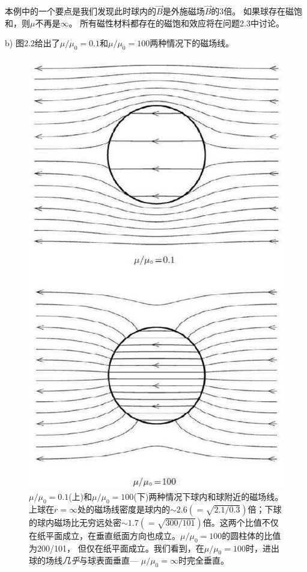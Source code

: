 本例中的一个要点是我们发现此时球内的$\vec{B}$是外施磁场$\vec{B}$的3倍。
如果球存在磁饱和，则$\mu$不再是$\infty$。
所有磁性材料都存在的磁饱和效应将在问题2.3中讨论。

b) 图2.2给出了$\mu/\mu_0=0.1$和$\mu/\mu_0=100$两种情况下的磁场线。

\begin{figure}[htbp]
  \centering
 \includegraphics[scale=0.6]{chpt2/figs/fig2.2.eps}
  \caption{$\mu/\mu_0=0.1$(上)和$\mu/\mu_0=100$(下)两种情况下球内和球附近的磁场线。上球在$r=\infty$处的磁场线密度是球内的$\sim 2.6(=\sqrt{2.1/0.3})$倍；下球的球内磁场比无穷远处密$\sim 1.7(=\sqrt{300/101})$倍。这两个比值不仅在纸平面成立，在垂直纸面方向也成立。$\mu/\mu_0=100$的圆柱体的比值为200/101，
  但仅在纸平面成立。我们看到，在$\mu/\mu_0=100$时，进出球的场线\textit{几乎}与球表面垂直---
  $\mu/\mu_0=\infty$时完全垂直。}
\end{figure}

